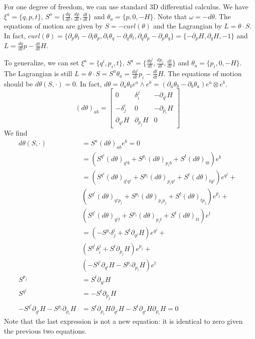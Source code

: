 \documentclass[11pt,letterpaper,fleqn]{memoir} %
\begin{document}
For one degree of freedom, we can use standard 3D differential calculus. We have $\xi^a=\{q,p,t\}$, $S^a=\{\frac{dq}{dt},\frac{dp}{dt},\frac{dt}{dt}\}$ and $\theta_a=\{p,0,-H\}$. Note that $\omega = -d \theta$. The equations of motion are given by $S=-curl(\theta)$ and the Lagrangian by $L=\theta \cdot S$. In fact, $curl(\theta)=\{\partial_p \theta_t - \partial_t \theta_p, \partial_t \theta_q - \partial_q \theta_t, \partial_q \theta_p - \partial_p \theta_q\} = \{ -\partial_p H , \partial_q H , - 1 \}$ and $L = \frac{dq}{dt}p - \frac{dt}{dt}H$.

To generalize, we can set $\xi^a=\{q^i,p_i,t\}$, $S^a=\{\frac{dq^i}{dt},\frac{dp_i}{dt},\frac{dt}{dt}\}$ and $\theta_a=\{p_i,0,-H\}$. The Lagrangian is still $L=\theta \cdot S = S^a \theta_a = \frac{dq^i}{dt}p_i - \frac{dt}{dt}H$. The equations of motion should be $d\theta(S, \cdot ) = 0$. In fact, $d\theta = \partial_a \theta_b e^a \wedge e^b = (\partial_a \theta_b - \partial_b \theta_a) e^a \otimes e^b$.
\begin{equation*}
(d\theta)_{ab} = \begin{bmatrix}
0 & \delta^j_i & - \partial_{q^i} H \\
-\delta^i_j & 0 & - \partial_{p_i} H \\
\partial_{q^j} H & \partial_{p_j} H & 0
\end{bmatrix}
\end{equation*}
We find
\begin{align*}
d\theta(S, \cdot )  &= S^a (d\theta)_{ab} e^b = 0 \\
&= (S^{q^i}(d\theta)_{q^ib} + S^{p_i}(d\theta)_{p_ib} + S^{t}(d\theta)_{tb}) e^b \\
&= (S^{q^i}(d\theta)_{q^iq^j} + S^{p_i}(d\theta)_{p_iq^j} + S^{t}(d\theta)_{tq^j}) e^{q^j} + \\
& (S^{q^i}(d\theta)_{q^ip_j} +  S^{p_i}(d\theta)_{p_ip_j} + S^{t}(d\theta)_{tp_j}) e^{p_j} + \\
& (S^{q^i}(d\theta)_{q^it} + S^{p_i}(d\theta)_{p_it} + S^{t}(d\theta)_{tt}) e^t \\
&= (-S^{p_i}\delta^i_j + S^{t}\partial_{q^j} H ) e^{q^j} + \\
& (S^{q^i}\delta^j_i +  S^{t}\partial_{p_j} H) e^{p_j} + \\
& (-S^{q^i} \partial_{q^i} H - S^{p_i} \partial_{p_i} H) e^t \\
S^{p_j} &= S^{t} \partial_{q^j} H \\
S^{q^j} &= - S^{t}\partial_{p_j} H \\
-S^{q^i} \partial_{q^i} H - S^{p_i} \partial_{p_i} H &= S^{t}\partial_{p_i} H \partial_{q^i} H - S^{t} \partial_{q^i} H \partial_{p_i} H = 0
\end{align*}
Note that the last expression is not a new equation: it is identical to zero given the previous two equations.
\end{document}
